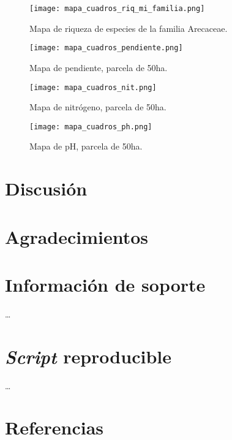 \documentclass[11pt,]{article}
\begin{document}
\begin{figure}
\centering
\texttt{[image: mapa\_cuadros\_riq\_mi\_familia.png]}
\caption{Mapa de riqueza de especies de la familia Arecaceae.
\label{fig:mapa_cuadros_riq_mi_familia}}
\end{figure}

\begin{figure}
\centering
\texttt{[image: mapa\_cuadros\_pendiente.png]}
\caption{Mapa de pendiente, parcela de 50ha.
\label{fig:mapa_cuadros_pendiente}}
\end{figure}

\begin{figure}
\centering
\texttt{[image: mapa\_cuadros\_nit.png]}
\caption{Mapa de nitrógeno, parcela de 50ha.
\label{fig:mapa_cuadros_nitrógeno}}
\end{figure}

\begin{figure}
\centering
\texttt{[image: mapa\_cuadros\_ph.png]}
\caption{Mapa de pH, parcela de 50ha. \label{fig:mapa_cuadros_pH}}
\end{figure}

\section{Discusión}\label{discusiuxf3n}

\section{Agradecimientos}\label{agradecimientos}

\section{Información de soporte}\label{informaciuxf3n-de-soporte}

\ldots

\section{\texorpdfstring{\emph{Script}
reproducible}{Script reproducible}}\label{script-reproducible}

\ldots

\section*{Referencias}\label{referencias}
\end{document}

